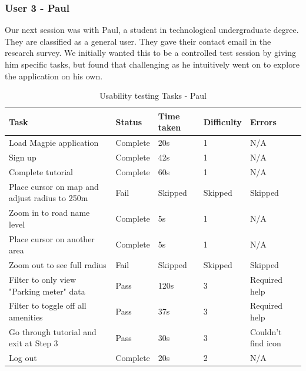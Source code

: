 \subsubsection{User 3 - Paul}
Our next session was with Paul, a student in technological undergraduate degree.
They are classified as a general user. They gave their contact email in the
research survey. We initially wanted this to be a controlled test session by
giving him specific tasks, but found that challenging as he intuitively went on
to explore the application on his own.
\begin{table}[h!]
    \centering
    \caption{Usability testing Tasks - Paul}
    \begin{tabular}{|p{}|p{}|p{}|p{}|p{}|}
        \hline
        \textbf{Task}                                 & \textbf{Status} & \textbf{Time taken} & \textbf{Difficulty} & \textbf{Errors}    \\
        \hline
        Load Magpie application                       & Complete        & 20s                 & 1                   & N/A                \\
        \hline
        Sign up                                       & Complete        & 42s                 & 1                   & N/A                \\
        \hline
        Complete tutorial                             & Complete        & 60s                 & 1                   & N/A                \\
        \hline
        Place cursor on map and adjust radius to 250m & Fail            & Skipped             & Skipped             & Skipped            \\
        \hline
        Zoom in to road name level                    & Complete        & 5s                  & 1                   & N/A                \\
        \hline
        Place cursor on another area                  & Complete        & 5s                  & 1                   & N/A                \\
        \hline
        Zoom out to see full radius                   & Fail            & Skipped             & Skipped             & Skipped            \\
        \hline
        Filter to only view "Parking meter" data      & Pass            & 120s                & 3                   & Required help      \\
        \hline
        Filter to toggle off all amenities            & Pass            & 37s                 & 3                   & Required help      \\
        \hline
        Go through tutorial and exit at Step 3        & Pass            & 30s                 & 3                   & Couldn't find icon \\
        \hline
        Log out                                       & Complete        & 20s                 & 2                   & N/A                \\
        \hline
    \end{tabular}
\end{table}\\
